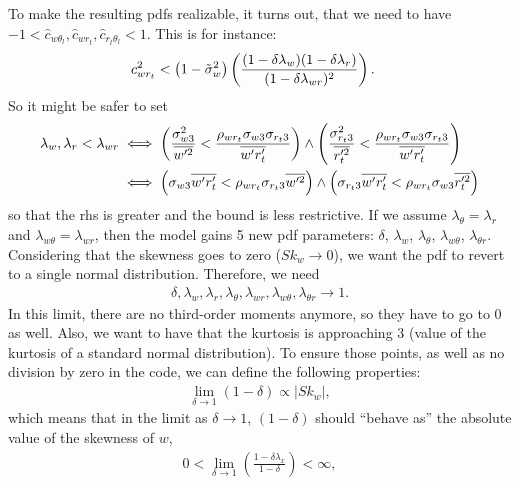 To make the resulting \glspl{pdf} realizable, it turns out\autocite{larson2022clubbsilhs}, that we need to have
$-1 < \widehat{c}_{w \theta_l}, \widehat{c}_{w r_t}, \widehat{c}_{r_t \theta_l} < 1$.
This is for instance:
\begin{align}
    c_{w r_t}^2 &< \left( 1 - \tilde{\sigma}_w^2 \right) \left(
    \frac{(1-\delta \lambda_w)(1-\delta \lambda_r)}{(1-\delta \lambda_{w r})^2}
    \right).
\end{align}
So it might be safer to set
\begin{align}
    \label{eq:lambda_corr_ineq}
    \lambda_w , \lambda_r < \lambda_{w r}
    &\iff
    \left(\frac{\sigma_{w 3}^2}{\overline{w'^2}} < \frac{\rho_{w r_t} \sigma_{w 3} \sigma_{r_t 3}}{\overline{w' r_t'}}\right)
    \land
    \left(\frac{\sigma_{r_t 3}^2}{\overline{r_t'^2}} < \frac{\rho_{w r_t} \sigma_{w 3} \sigma_{r_t 3}}{\overline{w' r_t'}}\right) \nonumber\\
    &\iff
    \left(\sigma_{w 3} \overline{w' r_t'} < \rho_{w r_t} \sigma_{r_t 3} \overline{w'^2}\right)
    \land
    \left(\sigma_{r_t 3} \overline{w' r_t'} < \rho_{w r_t} \sigma_{w 3} \overline{r_t'^2}\right) \nonumber\\
\end{align}
so that the \gls{rhs} is greater and the bound is less restrictive.
If we assume $\lambda_\theta = \lambda_r$ and $\lambda_{w\theta} = \lambda_{wr}$,
then the model gains 5 new \gls{pdf} parameters:
$\delta$, $\lambda_w$, $\lambda_\theta$, $\lambda_{w \theta}$, $\lambda_{\theta r}$.
Considering that the skewness goes to zero ($Sk_w \to 0$),
we want the \gls{pdf} to revert to a single normal distribution.
Therefore, we need
\begin{align}
    \delta, \lambda_w, \lambda_r, \lambda_\theta,
    \lambda_{w r}, \lambda_{w \theta}, \lambda_{\theta r}
    \to 1.
\end{align}
In this limit, there are no third-order moments anymore, so they have to go to 0 as well.
Also, we want to have that the kurtosis is approaching 3 (value of the kurtosis of a standard normal distribution).
To ensure those points, as well as no division by zero in the code, we can define the following properties:
\begin{align}
    \label{eq:delta_propto}
    \lim_{\delta \to 1} (1-\delta) \propto |Sk_w|,
\end{align}
which means that in the limit as $\delta \to 1$,
$(1-\delta)$ should \enquote{behave as} the absolute value of the skewness of $w$,
\begin{align}
    0 < \lim_{\delta\to 1} \left(\frac{1-\delta\lambda_x}{1-\delta}\right) < \infty,
\end{align}

